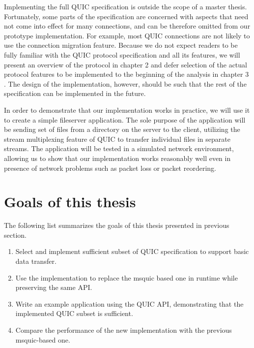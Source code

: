 Implementing the full QUIC specification is outside the scope of a master thesis. Fortunately, some
parts of the specification are concerned with aspects that need not come into effect for many
connections, and can be therefore omitted from our prototype implementation. For example, most QUIC
connections are not likely to use the connection migration feature. Because we do not expect readers
to be fully familiar with the QUIC protocol specification and all its features, we will present an
overview of the protocol in chapter 2  and defer selection of the actual protocol
features to be implemented to the beginning of the analysis in chapter 3 . The design of
the implementation, however, should be such that the rest of the specification can be implemented in
the future.


In order to demonstrate that our implementation works in practice, we will use it to create a simple
fileserver application. The sole purpose of the application will be sending set of files from a
directory on the server to the client, utilizing the stream multiplexing feature of QUIC to transfer
individual files in separate streams. The application will be tested in a simulated network
environment, allowing us to show that our implementation works reasonably well even in presence of
network problems such as packet loss or packet reordering.


\section{Goals of this thesis}

The following list summarizes the goals of this thesis presented in previous section.

\begin{enumerate}
  \item Select and implement sufficient subset of QUIC specification to support basic data transfer.

  \item Use the implementation to replace the msquic based one in \dotnet{} runtime while preserving
    the same API\@.

  \item Write an example application using the QUIC API, demonstrating that the implemented QUIC
    subset is sufficient.

  \item Compare the performance of the new implementation with the previous msquic-based one.

\end{enumerate}
